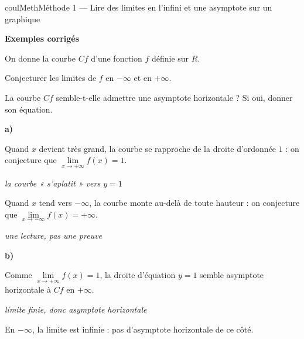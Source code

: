 \documentclass[11pt,a4paper]{article}
\makeatletter
\newcommand{\R}{\mathbb{R}}
\newcommand{\N}{\mathbb{N}}
\newcommand{\Z}{\mathbb{Z}}
\newcommand{\Q}{\mathbb{Q}}
\newcommand{\vect}[1]{\overrightarrow{#1}}
\newcommand{\fois}[1]{\times{\color{coulExo}#1}}
\newcommand{\lycee@repere}[4]{%
  \draw[grille,step=1] (#1,#2) grid (#3,#4);
  \draw[-{Stealth[length=2mm]},thick] (#1,0)--({#3+0.4},0) node[below left=-1pt]{$x$};
  \draw[-{Stealth[length=2mm]},thick] (0,#2)--(0,{#4+0.4}) node[below left=-1pt]{$y$};
  \node[below left,font=\scriptsize,inner sep=1.5pt] at (0,0) {$0$};}
\newcommand{\lycee@gradx}[1]{\foreach \k/\l in {#1}{%
  \draw (\k,0.07)--(\k,-0.07) node[below,font=\scriptsize,inner sep=1.5pt]{$\l$};}}
\newcommand{\lycee@grady}[1]{\foreach \k/\l in {#1}{%
  \draw (0.07,\k)--(-0.07,\k) node[left,font=\scriptsize,inner sep=1.5pt]{$\l$};}}
\providecommand{\repere}{\lycee@repere}%
\providecommand{\gradx}{\lycee@gradx}%
\providecommand{\grady}{\lycee@grady}%
\providecommand{\Cf}{\mathcal{C}\sb{f}}%
\providecommand{\Cg}{\mathcal{C}\sb{g}}%
\newcounter{lycee@signet}
\newcommand{\signet}[3][]{\stepcounter{lycee@signet}%
  \edef\lycee@dest{\if\relax\detokenize{#1}\relax
    signet.\arabic{lycee@signet}\else#1\fi}%
  \hypertarget{\lycee@dest}{}\bookmark[level=#2,dest=\lycee@dest]{#3}}
\def\R{R}\def\N{N}\def\Z{Z}\def\Q{Q}\def\vect#1{#1}\def\Cf{Cf}\def\Cg{Cg}\def\fois#1{×#1}%
\newcommand{\res}[1]{#1}
\newcounter{methode}
\newenvironment{methodebox}[1][Méthode]{\stepcounter{methode}%
  \begin{boitecours}[phantom={\signet[methode-\arabic{methode}]{2}{#1}}]{coulMeth}{#1}}%
  {\end{boitecours}}
\newcommand{\etape}[1]{\par\smallskip\textbf{\color{coulMeth}#1}\par\nobreak\smallskip}
\newcommand{\explique}[2]{\par\smallskip\noindent
  \begin{minipage}[t]{0.57\linewidth}\raggedright #1\end{minipage}\hfill
  \begin{minipage}[t]{0.40\linewidth}\raggedright\leavevmode
    {\small\itshape\color{black!60}#2}\end{minipage}\par}
\newcommand{\cas}[1]{\par\smallskip\noindent\textbf{\color{coulExo}#1}\vadjust{\nobreak}}
\newenvironment{correction}{\par}{\par}
\newcommand{\etapeexemples}{\etape{Exemples corrigés}}
\makeatother
\begin{document}
\begin{methodebox}[Méthode 1 --- Lire des limites en l'infini et une asymptote sur un graphique]
\etapeexemples
\begin{minipage}[c]{0.58\linewidth}\raggedright
On donne la courbe $\Cf$ d'une fonction $f$ définie sur $\R$.
\begin{questions}[label=\alph*)]
  \item Conjecturer les limites de $f$ en $-\infty$ et en $+\infty$.
  \item La courbe $\Cf$ semble-t-elle admettre une asymptote horizontale ? Si oui,
        donner son équation.
\end{questions}
\end{minipage}\hfill
\begin{minipage}[c]{0.38\linewidth}\centering
{}
\end{minipage}
\begin{correction}
\cas{a)}
\explique{Quand $x$ devient très grand, la courbe se rapproche de la droite d'ordonnée
$1$ : on conjecture que \res{$\lim\limits_{x\to+\infty}f(x)=1$}.}{la courbe « s'aplatit »
vers $y=1$}
\explique{Quand $x$ tend vers $-\infty$, la courbe monte au-delà de toute hauteur : on
conjecture que \res{$\lim\limits_{x\to-\infty}f(x)=+\infty$}.}{une lecture, pas une
preuve}
\cas{b)}
\explique{Comme $\lim\limits_{x\to+\infty}f(x)=1$, la droite d'équation \res{$y=1$} semble
asymptote horizontale à $\Cf$ en $+\infty$.}{limite finie, donc asymptote
horizontale}
\explique{En $-\infty$, la limite est infinie : pas d'asymptote horizontale de ce
côté.}{}
\end{correction}


\end{methodebox}
\end{document}
